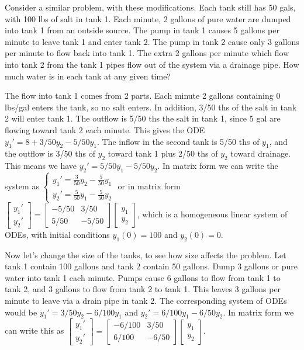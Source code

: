 Consider a similar problem, with these modifications.  Each tank still has 50 gals, with 100 lbs of salt in tank 1.  Each minute, 2 gallons of pure water are dumped into tank 1 from an outside source. The pump in tank 1 causes 5 gallons per minute to leave tank 1 and enter tank 2.  The pump in tank 2 cause only 3 gallons per minute to flow back into tank 1. The extra 2 gallons per minute which flow into tank 2 from the tank 1 pipes flow out of the system via a drainage pipe.  How much water is in each tank at any given time?

The flow into tank 1 comes from 2 parts. Each minute 2 gallons containing 0 lbs/gal enters the tank, so no salt enters.  In addition, 3/50 ths of the salt in tank 2 will enter tank 1.  The outflow is 5/50 ths the salt in tank 1, since 5 gal are flowing toward tank 2 each minute.  This gives the ODE $y_1' = 8+3/50 y_2 - 5/50 y_1$.  The inflow in the second tank is 5/50 ths of $y_1$, and the outflow is 3/50 ths of $y_2$ toward tank 1 plus 2/50 ths of $y_2$ toward drainage.  This means we have $y_2' = 5/50 y_1 -5/50 y_2$.  In matrix form we can write the system as 
$\begin{cases}
y_1' = \frac{3}{50}y_2 - \frac{5}{50}y_1\\
y_2' = \frac{5}{50}y_1 - \frac{5}{50}y_2
\end{cases}$ or in matrix form 
$
\begin{bmatrix}
y_1'\\
y_2'
\end{bmatrix}
=
\begin{bmatrix}
-5/50&3/50\\
5/50&-5/50
\end{bmatrix}
\begin{bmatrix}
y_1\\
y_2
\end{bmatrix}
$, which is a homogeneous linear system of ODEs, with initial conditions $y_1(0)=100$ and $y_2(0)=0$. 

Now let's change the size of the tanks, to see how size affects the problem.  Let tank 1 contain 100 gallons and tank 2 contain 50 gallons. Dump 3 gallons or pure water into tank 1 each minute.  Pumps cause 6 gallons to flow from tank 1 to tank 2, and 3 gallons to flow from tank 2 to tank 1.  This leaves 3 gallons per minute to leave via a drain pipe in tank 2. The corresponding system of ODEs would be $y_1' = 3/50 y_2 - 6/100 y_1$ and $y_2' = 6/100 y_1 - 6/50 y_2$. In matrix form we can write this as  
$
\begin{bmatrix}
y_1'\\
y_2'
\end{bmatrix}
=
\begin{bmatrix}
-6/100&3/50\\
6/100&-6/50
\end{bmatrix}
\begin{bmatrix}
y_1\\
y_2
\end{bmatrix}
$.
 
